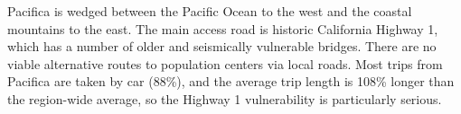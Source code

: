 

Pacifica is wedged between the Pacific Ocean to the west and the coastal mountains to the east. The main access road is historic California Highway 1, which has a number of older and seismically vulnerable bridges. There are no viable alternative routes to population centers via local roads. Most trips from Pacifica are taken by car (88\%), and the average trip length is 108\% longer than the region-wide average, so the Highway 1 vulnerability is particularly serious.

